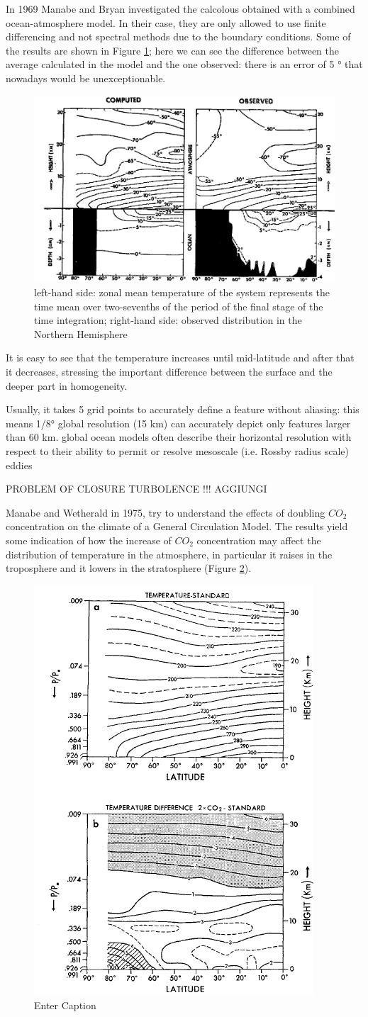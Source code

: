 In 1969 Manabe and Bryan investigated the calcolous obtained with a combined ocean-atmosphere model. In their case, they are only allowed to use finite differencing and not spectral methods due to the boundary conditions. Some of the results are shown in Figure \ref{fig:result}; here we can see the difference between the average calculated in the model and the one observed: there is an error of 5 ° that nowadays would be unexceptionable.


\begin{figure}[h!]
	\centering
	\includegraphics[width=0.5\linewidth]{uploads/50image.png}
	\caption{left-hand side: zonal mean temperature of the system represents the time mean over two-sevenths of the period of the final stage of the time integration; right-hand side: observed distribution in the Northern Hemisphere}
	\label{fig:result}
\end{figure}

It is easy to see that the temperature increases until mid-latitude and after that it decreases, stressing the important difference between the surface and the deeper part in homogeneity.


Usually, it takes 5 grid points to accurately define a
feature without aliasing: this means 1/8°
global resolution (15 km) can accurately
depict only features larger than 60 km.
global ocean models often describe their horizontal
resolution with respect to their ability to permit or
resolve mesoscale (i.e. Rossby radius scale) eddies

PROBLEM OF CLOSURE TURBOLENCE !!! AGGIUNGI


Manabe and Wetherald in 1975, try to understand the effects of doubling $CO_2$ concentration on the climate of a General Circulation Model. The results yield some indication of how the increase of $CO_2$ concentration may affect the distribution of temperature in the atmosphere, in particular it raises in the troposphere and it lowers in the stratosphere (Figure \ref{fig:fig 51}).
\begin{figure}[h!]
	\centering
	\includegraphics[width=0.3\linewidth]{uploads/51image.png}
	\caption{Enter Caption}
	\label{fig:fig 51}
\end{figure}
\\
\\
